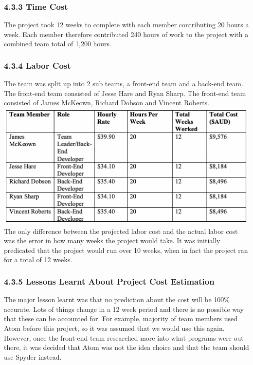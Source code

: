 \documentclass[11pt]{article}
\begin{document}
\begin{adjustwidth}{1cm}{}
\subsubsection{4.3.3 Time Cost}
The project took 12 weeks to complete with each member contributing 20 hours a week. Each member therefore contributed 240 hours of work to the project with a combined team total of 1,200 hours.

\subsubsection{4.3.4 Labor Cost}
The team was split up into 2 sub teams, a front-end team and a back-end team. The front-end team consisted of Jesse Hare and Ryan Sharp. The front-end team consisted of James McKeown, Richard Dobson and Vincent Roberts. \\

\includegraphics[scale=0.71]{team_cost.png} \\

The only difference between the projected labor cost and the actual labor cost was the error in how many weeks the project would take. It was initially predicated that the project would run over 10 weeks, when in fact the project ran for a total of 12 weeks.

\subsubsection{4.3.5 Lessons Learnt About Project Cost Estimation}
The major lesson learnt was that no prediction about the cost will be 100\% accurate. Lots of things change in a 12 week period and there is no possible way that these can be accounted for. For example, majority of team members used Atom before this project, so it was assumed that we would use this again. However, once the front-end team researched more into what programs were out there, it was decided that Atom was not the idea choice and that the team should use Spyder instead. \\

\end{adjustwidth}
\end{document}
